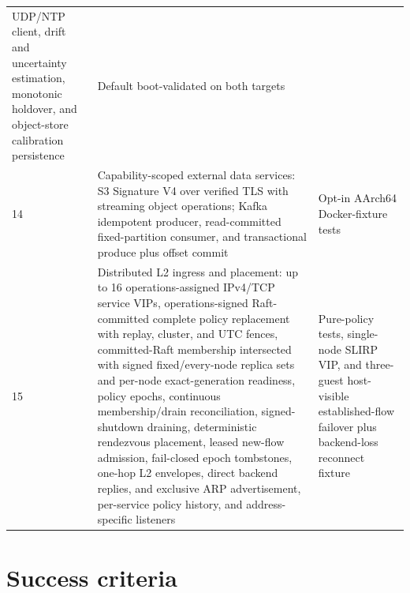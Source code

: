 \begin{longtable}{|p{1.1cm}|p{7.4cm}|p{3cm}|}
    UDP/NTP client, drift and uncertainty estimation, monotonic holdover, and
    object-store calibration persistence & Default boot-validated on both targets \\
14 & Capability-scoped external data services: S3 Signature V4 over verified
    TLS with streaming object operations; Kafka idempotent producer,
    read-committed fixed-partition consumer, and transactional produce plus
    offset commit & Opt-in AArch64 Docker-fixture tests \\
15 & Distributed L2 ingress and placement: up to 16 operations-assigned
    IPv4/TCP service VIPs,
    operations-signed Raft-committed complete policy replacement with replay,
    cluster, and UTC fences,
    committed-Raft membership intersected with signed fixed/every-node replica
    sets and per-node exact-generation readiness, policy epochs, continuous
    membership/drain reconciliation, signed-shutdown draining, deterministic
    rendezvous placement, leased new-flow admission, fail-closed epoch
    tombstones, one-hop L2 envelopes, direct backend replies, and exclusive
    ARP advertisement, per-service policy history, and address-specific
    listeners & Pure-policy tests, single-node SLIRP VIP, and three-guest
    host-visible established-flow failover plus backend-loss reconnect fixture \\
\hline
\end{longtable}

\section{Success criteria}

